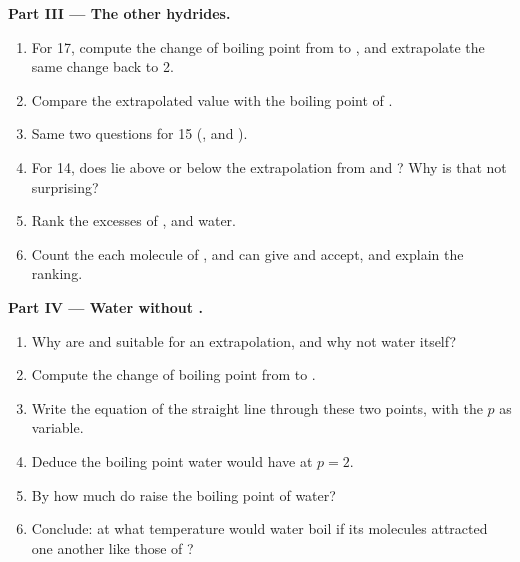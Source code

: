\begin{problem}
\medskip
\noindent\textbf{Part III --- The other hydrides.}
\begin{enumerate}[resume]
  \item For  17, compute the change of boiling point from  to
        , and extrapolate the same change back to  2.
  \item Compare the extrapolated value with the boiling point of .
  \item Same two questions for  15 (,  and
        ).
  \item For  14, does  lie above or below the extrapolation
        from  and ? Why is that not surprising?
  \item Rank the excesses of ,  and water.
  \item Count the  each molecule of ,  and
         can give and accept, and explain the ranking.
\end{enumerate}

\medskip
\noindent\textbf{Part IV --- Water without .}
\begin{enumerate}[resume]
  \item Why are  and  suitable for an extrapolation, and
        why not water itself?
  \item Compute the change of boiling point from  to .
  \item Write the equation of the straight line through these two points,
        with the  $p$ as variable.
  \item Deduce the boiling point water would have at $p = 2$.
  \item By how much do  raise the boiling point of water?
  \item Conclude: at what temperature would water boil if its molecules
        attracted one another like those of ?
\end{enumerate}
\end{problem}
